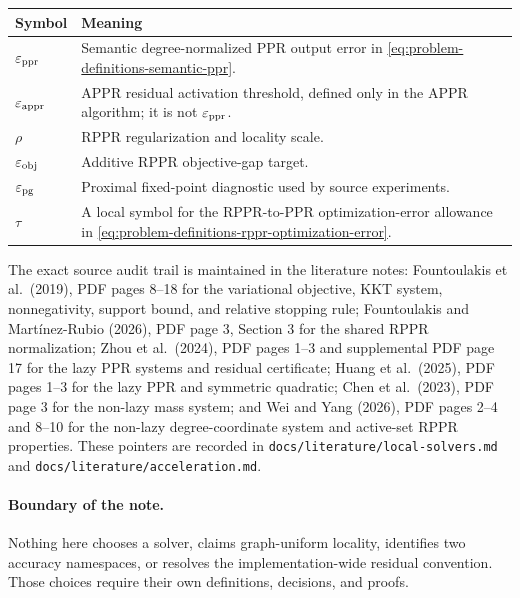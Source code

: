 \documentclass[11pt]{article}
\theoremstyle{definition}
\theoremstyle{remark}
\theoremstyle{plain}
\begin{document}
\begin{center}
\begin{tabularx}{0.97\textwidth}{@{}
    >{\raggedright\arraybackslash}p{}
    >{\raggedright\arraybackslash}X@{}}
\toprule
Symbol & Meaning \\
\midrule
$\varepsilon_{\mathrm{ppr}}$ & Semantic degree-normalized PPR output error in
\cref{eq:problem-definitions-semantic-ppr}. \\
$\varepsilon_{\mathrm{appr}}$ & APPR residual activation threshold, defined only in the APPR
algorithm; it is not $\varepsilon_{\mathrm{ppr}}$. \\
$\rho$ & RPPR regularization and locality scale. \\
$\varepsilon_{\mathrm{obj}}$ & Additive RPPR objective-gap target. \\
$\varepsilon_{\mathrm{pg}}$ & Proximal fixed-point diagnostic used by source experiments. \\
$\tau$ & A local symbol for the RPPR-to-PPR optimization-error allowance in
\cref{eq:problem-definitions-rppr-optimization-error}. \\
\bottomrule
\end{tabularx}
\end{center}

The exact source audit trail is maintained in the literature notes:
Fountoulakis et al.\ (2019), PDF pages 8--18 for the variational objective,
KKT system, nonnegativity, support bound, and relative stopping rule;
Fountoulakis and Mart\'inez-Rubio (2026), PDF page 3, Section 3 for the shared
RPPR normalization; Zhou et al.\ (2024), PDF pages 1--3 and supplemental PDF
page 17 for the lazy PPR systems and residual certificate; Huang et al.\
(2025), PDF pages 1--3 for the lazy PPR and symmetric quadratic; Chen et al.\
(2023), PDF page 3 for the non-lazy mass system; and Wei and Yang (2026), PDF
pages 2--4 and 8--10 for the non-lazy degree-coordinate system and active-set
RPPR properties.  These pointers are recorded in
\texttt{docs/literature/local-solvers.md} and
\texttt{docs/literature/acceleration.md}.

\paragraph{Boundary of the note.}
Nothing here chooses a solver, claims graph-uniform locality, identifies two
accuracy namespaces, or resolves the implementation-wide residual convention.
Those choices require their own definitions, decisions, and proofs.



\end{document}
